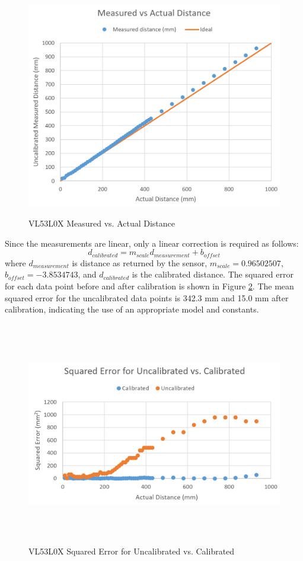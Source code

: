 \begin{figure}[H]   %
	\centering \includegraphics[width=6in, height=3.85in, keepaspectratio]{figures/rangefinder_measurement.png}
	\caption{VL53L0X Measured vs. Actual Distance}\label{fig:rangefinder_measurement}
\end{figure}

Since the measurements are linear, only a linear correction is required as follows:
\begin{equation}
	d_{calibrated} = m_{scale} d_{measurement} + b_{offset}
\end{equation}
where $d_{measurement} $ is distance as returned by the sensor, $m_{scale} = 0.96502507$, $b_{offset} = -3.8534743$, and $d_{calibrated}$ is the calibrated distance. The squared error for each data point before and after calibration is shown in Figure \ref{fig:rangefinder_calibrated}. The mean squared error for the uncalibrated data points is 342.3 mm and 15.0 mm after calibration, indicating the use of an appropriate model and constants.

\begin{figure}[H]   %
	\centering \includegraphics[width=6in, height=3.85in, keepaspectratio]{figures/rangefinder_calibrated.png}
	\caption{VL53L0X Squared Error for Uncalibrated vs. Calibrated}\label{fig:rangefinder_calibrated}
\end{figure}

